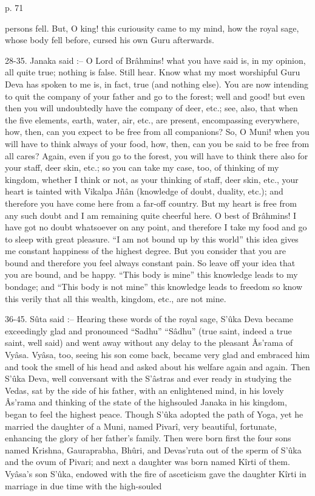  

p. 71

 

persons fell. But, O king! this curiousity came to my mind, how the royal sage, whose body fell before, cursed his own Guru afterwards.

 

28-35. Janaka said :-- O Lord of Brâhmins! what you have said is, in my opinion, all quite true; nothing is false. Still hear. Know what my most worshipful Guru Deva has spoken to me is, in fact, true (and nothing else). You are now intending to quit the company of your father and go to the forest; well and good! but even then you will undoubtedly have the company of deer, etc.; see, also, that when the five elements, earth, water, air, etc., are present, encompassing everywhere, how, then, can you expect to be free from all companions? So, O Muni! when you will have to think always of your food, how, then, can you be said to be free from all cares? Again, even if you go to the forest, you will have to think there also for your staff, deer skin, etc.; so you can take my case, too, of thinking of my kingdom, whether I think or not, as your thinking of staff, deer skin, etc., your heart is tainted with Vikalpa Jñân (knowledge of doubt, duality, etc.); and therefore you have come here from a far-off country. But my heart is free from any such doubt and I am remaining quite cheerful here. O best of Brâhmins! I have got no doubt whatsoever on any point, and therefore I take my food and go to sleep with great pleasure. “I am not bound up by this world” this idea gives me constant happiness of the highest degree. But you consider that you are bound and therefore you feel always constant pain. So leave off your idea that you are bound, and be happy. “This body is mine” this knowledge leads to my bondage; and “This body is not mine” this knowledge leads to freedom so know this verily that all this wealth, kingdom, etc., are not mine.

 

36-45. Sûta said :-- Hearing these words of the royal sage, S’ûka Deva became exceedingly glad and pronounced “Sadhu” “Sâdhu” (true saint, indeed a true saint, well said) and went away without any delay to the pleasant Âs’rama of Vyâsa. Vyâsa, too, seeing his son come back, became very glad and embraced him and took the smell of his head and asked about his welfare again and again. Then S’ûka Deva, well conversant with the S’âstras and ever ready in studying the Vedas, sat by the side of his father, with an enlightened mind, in his lovely Âs’rama and thinking of the state of the highsouled Janaka in his kingdom, began to feel the highest peace. Though S’ûka adopted the path of Yoga, yet he married the daughter of a Muni, named Pivarî, very beautiful, fortunate, enhancing the glory of her father's family. Then were born first the four sons named Krishna, Gauraprabha, Bhûri, and Devas'ruta out of the sperm of S’ûka and the ovum of Pivari; and next a daughter was born named Kîrti of them. Vyâsa's son S’ûka, endowed with the fire of asceticism gave the daughter Kîrti in marriage in due time with the high-souled

